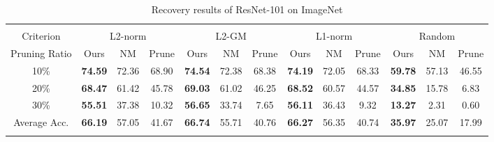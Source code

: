 \begin{table*}[t]
{\begin{tabular}{c||c|c|c||c|c|c||c|c|c||c|c|c}  \Xhline{2\arrayrulewidth}
\multicolumn{13}{c}{\textbf{ResNet101 - ImageNet (Acc. 77.31)}}
\\ \Xhline{2\arrayrulewidth} %
Criterion & \multicolumn{3}{c||}{L2-norm} & \multicolumn{3}{c||}{L2-GM} & \multicolumn{3}{c||}{L1-norm}& \multicolumn{3}{c}{Random}\\ \hline
Pruning Ratio& Ours& NM& Prune& Ours& NM& Prune& Ours& NM& Prune& Ours& NM& Prune
\\ \Xhline{2\arrayrulewidth}
10\%& \textbf{74.59} & 72.36 & 68.90 & \textbf{74.54} & 72.38 & 68.38 & \textbf{74.19} & 72.05 & 68.33 & \textbf{59.78} & 57.13 & 46.55 \\ \hline
20\%& \textbf{68.47} & 61.42 & 45.78 & \textbf{69.03} & 61.02 & 46.25 & \textbf{68.52} & 60.57 & 44.57 & \textbf{34.85} & 15.78 & 6.83  \\ \hline
30\%& \textbf{55.51} & 37.38 & 10.32 & \textbf{56.65} & 33.74 & 7.65  & \textbf{56.11} & 36.43 & 9.32  & \textbf{13.27} & 2.31  & 0.60  \\ \Xhline{2\arrayrulewidth}
Average Acc. & \textbf{66.19} & 57.05 & 41.67 & \textbf{66.74} & 55.71 & 40.76 & \textbf{66.27} & 56.35 & 40.74 & \textbf{35.97} & 25.07 & 17.99\\\Xhline{2\arrayrulewidth}
\end{tabular}
}
\vspace{2mm}
\caption{Recovery results of ResNet-101 on ImageNet} \label{tab:ResNet101-ImageNet}
\vspace{1.5mm}
\end{table*}


